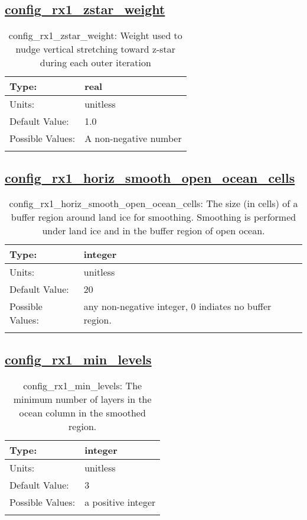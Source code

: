 \subsection[config\_rx1\_zstar\_weight]{\hyperref[sec:nm_tab_constrain_Haney_number]{config\_rx1\_zstar\_weight}}
\label{subsec:nm_sec_config_rx1_zstar_weight}
\begin{center}
\begin{longtable}{| p{2.0in} || p{4.0in} |}
    \hline
    Type: & real \\
    \hline
    Units: & \si{unitless} \\
    \hline
    Default Value: & 1.0 \\
    \hline
    Possible Values: & A non-negative number \\
    \hline
    \caption{config\_rx1\_zstar\_weight: Weight used to nudge vertical stretching toward z-star during each outer iteration}
\end{longtable}
\end{center}
\subsection[config\_rx1\_horiz\_smooth\_open\_ocean\_cells]{\hyperref[sec:nm_tab_constrain_Haney_number]{config\_rx1\_horiz\_smooth\_open\_ocean\_cells}}
\label{subsec:nm_sec_config_rx1_horiz_smooth_open_ocean_cells}
\begin{center}
\begin{longtable}{| p{2.0in} || p{4.0in} |}
    \hline
    Type: & integer \\
    \hline
    Units: & \si{unitless} \\
    \hline
    Default Value: & 20 \\
    \hline
    Possible Values: & any non-negative integer, 0 indiates no buffer region. \\
    \hline
    \caption{config\_rx1\_horiz\_smooth\_open\_ocean\_cells: The size (in cells) of a buffer region around land ice for smoothing.  Smoothing is performed under land ice and in the buffer region of open ocean.}
\end{longtable}
\end{center}
\subsection[config\_rx1\_min\_levels]{\hyperref[sec:nm_tab_constrain_Haney_number]{config\_rx1\_min\_levels}}
\label{subsec:nm_sec_config_rx1_min_levels}
\begin{center}
\begin{longtable}{| p{2.0in} || p{4.0in} |}
    \hline
    Type: & integer \\
    \hline
    Units: & \si{unitless} \\
    \hline
    Default Value: & 3 \\
    \hline
    Possible Values: & a positive integer \\
    \hline
    \caption{config\_rx1\_min\_levels: The minimum number of layers in the ocean column in the smoothed region.}
\end{longtable}
\end{center}
